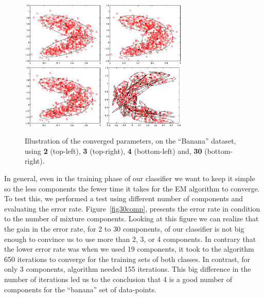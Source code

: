 \documentclass[a4paper,11pt]{article}
\begin{document}
\begin{figure}[h!]
  \centering   
      \includegraphics[width=0.35\textwidth]{figures/2comp.eps}\	
      \includegraphics[width=0.35\textwidth]{figures/3comp.eps}\	
      \includegraphics[width=0.35\textwidth]{figures/4comp.eps}\	
      \includegraphics[width=0.35\textwidth]{figures/30comp.eps}    
  \caption{Illustration of the converged parameters, on the ``Banana'' dataset, using \textbf{2} (top-left), \textbf{3} (top-right), \textbf{4} (bottom-left) and, \textbf{30} (bottom-right).}
  \label{fig23430comp}
\end{figure}

In general, even in the training phase of our classifier we want to keep it  simple so the less components the fewer time it takes for the EM algorithm to converge. To test this, we performed a test using different number of components and evaluating the error rate. Figure~\ref{fig30comp}, presents the error rate in condition to the number of mixture components. Looking at this figure we can realize that the gain in the error rate, for 2 to 30 components, of our classifier is not big enough to convince us to use more than 2, 3, or 4 components. In contrary that the lower error rate was when we used 19 components, it took to the algorithm 650 iterations to converge for the training sets of both classes. In contrast, for only 3 components, algorithm needed 155 iterations. This big difference in the number of iterations led us to the conclusion that 4 is a good number of components for the ``banana'' set of data-points.
\end{document}
